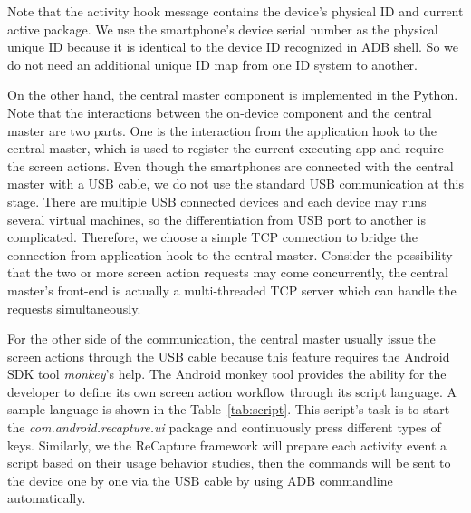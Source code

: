 Note that the activity hook message contains the device's physical ID and current active package. We use the smartphone's device serial number as the physical unique ID because it is identical to the device ID recognized in ADB shell. So we do not need an additional unique ID map from one ID system to another.

On the other hand, the central master component is implemented in the Python. Note that the interactions between the on-device component and the central master are two parts. One is the interaction from the application hook to the central master, which is used to register the current executing app and require the screen actions. Even though the smartphones are connected with the central master with a USB cable, we do not use the standard USB communication at this stage. There are multiple USB connected devices and each device may runs several virtual machines, so the differentiation from USB port to another is complicated. Therefore, we choose a simple TCP connection to bridge the connection from application hook to the central master. Consider the possibility that the two or more screen action requests may come concurrently, the central master's front-end is actually a multi-threaded TCP server which can handle the requests simultaneously.

For the other side of the communication, the central master usually issue the screen actions through the USB cable because this feature requires the Android SDK tool \emph{monkey}'s help. The Android monkey tool provides the ability for the developer to define its own screen action workflow through its script language. A sample language is shown in the Table~\ref{tab:script}. This script's task is to start the \emph{com.android.recapture.ui} package and continuously press different types of keys. Similarly, we the ReCapture framework will prepare each activity event a script based on their usage behavior studies, then the commands will be sent to the device one by one via the USB cable by using ADB commandline automatically.

